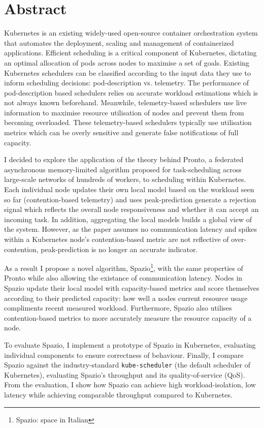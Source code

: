 \chapter*{Abstract}

Kubernetes is an existing widely-used open-source container orchestration system
that automates the deployment, scaling and management of containerized
applications. Efficient scheduling is a critical component of Kubernetes,
dictating an optimal allocation of pods across nodes to maximise a set of goals.
Existing Kubernetes schedulers can be classified according to the input data
they use to inform scheduling decisions: pod-description vs. telemetry. The
performance of pod-description based schedulers relies on accurate workload
estimations which is not always known beforehand. Meanwhile, telemetry-based
schedulers use live information to maximise resource utilisation of nodes and
prevent them from becoming overloaded. These telemetry-based schedulers
typically use utilisation metrics which can be overly sensitive and generate
false notifications of full capacity.

I decided to explore the application of the theory behind Pronto, a federated
asynchronous memory-limited algorithm proposed for task-scheduling across
large-scale networks of hundreds of workers, to scheduling within Kubernetes.
Each individual node updates their own local model based on the workload seen so
far (contention-based telemetry) and uses peak-prediction generate a rejection
signal which reflects the overall node responsiveness and whether it can accept
an incoming task. In addition, aggregating the local models builds a global view
of the system. However, as the paper assumes no communication latency and spikes
within a Kubernetes node's contention-based metric are not reflective of
over-contention, peak-prediction is no longer an accurate indicator.

As a result I propose a novel algorithm, Spazio\footnote{Spazio: space in
Italian}, with the same properties of Pronto while also allowing the existance
of communication latency. Nodes in Spazio update their local model with
capacity-based metrics and score themselves according to their predicted
capacity: how well a nodes current resource usage compliments recent measured
workload. Furthermore, Spazio also utilises contention-based metrics to more
accurately measure the resource capacity of a node.

To evaluate Spazio, I implement a prototype of Spazio in Kubernetes, evaluating
individual components to ensure correctness of behaviour. Finally, I compare
Spazio against the industry-standard \verb|kube-scheduler| (the default
scheduler of Kubernetes), evaluating Spazio's throughput and its
quality-of-service (QoS). From the evaluation, I show how Spazio can achieve
high workload-isolation, low latency while achieving comparable throughput
compared to Kubernetes.
